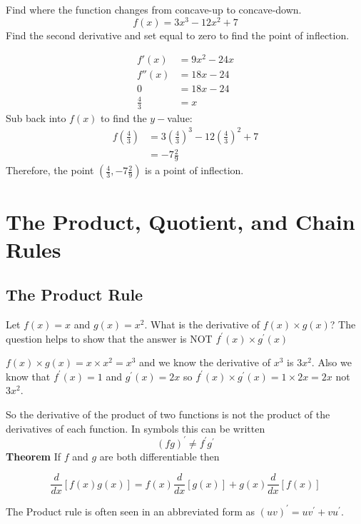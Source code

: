 \example Find where the function changes from concave-up to concave-down.\\
\[f(x)=3x^3-12x^2+7\]
\solution Find the second derivative and set equal to zero to find the point of inflection.
\begin{multicols}{2}
\begin{align*}
f'(x)&=9x^2-24x\\
f''(x)&=18x-24\\
0&=18x-24\\
\frac{4}{3}&=x
\end{align*}
Sub back into $f(x)$ to find the $y-$value:\\
\begin{align*}
f\left(\frac{4}{3}\right)&=3\left(\frac{4}{3}\right)^3-12\left(\frac{4}{3}\right)^2+7\\
&=-7\tfrac{2}{9}
\end{align*}
Therefore, the point $\left(\tfrac{4}{3},-7\frac{2}{9}\right)$ is a point of inflection.
\end{multicols}

\section{The Product, Quotient, and Chain Rules}\label{sec:chainRule}

\subsection*{The Product Rule}
Let $f (x) =x$ and $g (x) =x^{2}$. What is the derivative of $f (x) \times g (x)$? The question helps to show that the answer is NOT $f^{ \prime } (x) \times g^{ \prime } (x)$

$f (x) \times g (x) =x \times x^{2} =x^{3}$ and we know the derivative of $x^{3}$ is $3 x^{2}$. Also we know that $f^{ \prime } (x) =1$ and $g^{ \prime } (x) =2 x$ so $f^{ \prime } (x) \times g^{ \prime } (x) =1 \times 2 x =2 x$ not $3 x^{2}$.

So the derivative of the product of two functions is not the product of the derivatives of each function. In symbols this can be written
\[\left (f g\right )^{ \prime } \neq f^{ \prime } g^{ \prime }\]
\textbf{Theorem} If $f$ and $g$ are both differentiable then
\begin{tcolorbox}
	\[\frac{d}{d x} \left [f (x) g (x)\right ] =f (x) \frac{d}{d x} \left [g (x)\right ] +g (x) \frac{d}{d x} \left [f (x)\right ]\]
	\end{tcolorbox}
The Product rule is often seen in an abbreviated form as $\displaystyle \left(u v\right)^{\prime} =uv^{\prime} +vu^{\prime}$.

